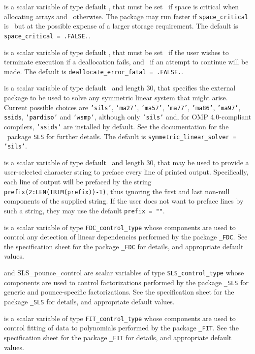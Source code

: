 \documentclass{galahad}
\begin{document}
\begin{description}
 is a scalar variable of type default \logical,
that must be set \true\ if space is critical when allocating arrays
and  \false\ otherwise. The package may run faster if
{\tt space\_critical} is \false\ but at the possible expense of a larger
storage requirement. The default is {\tt space\_critical = .FALSE.}.

 is a scalar variable of type default \logical,
that must be set \true\ if the user wishes to terminate execution if
a deallocation  fails, and \false\ if an attempt to continue
will be made. The default is {\tt deallocate\_error\_fatal = .FALSE.}.

 is a scalar variable of type default \character\
and length 30, that specifies the external package to be used to
solve any symmetric linear system that might arise. Current possible
choices are {\tt 'sils'}, {\tt 'ma27'}, {\tt 'ma57'}, {\tt 'ma77'},
{\tt 'ma86'}, {\tt 'ma97'}, {\tt ssids}, {\tt 'pardiso'}
and {\tt 'wsmp'},
although only {\tt 'sils'} and, for OMP 4.0-compliant compilers,
{\tt 'ssids'} are installed by default.
See the documentation for the \galahad\ package {\tt SLS} for further details.
The default is {\tt symmetric\_linear\_solver = 'sils'}.

 is a scalar variable of type default \character\
and length 30, that may be used to provide a user-selected
character string to preface every line of printed output.
Specifically, each line of output will be prefaced by the string
{\tt prefix(2:LEN(TRIM(prefix))-1)},
thus ignoring the first and last non-null components of the
supplied string. If the user does not want to preface lines by such
a string, they may use the default {\tt prefix = ""}.

 is a scalar variable of type
{\tt FDC\_control\_type}
whose components are used to control any detection of linear dependencies
performed by the package
{\tt \libraryname\_FDC}.
See the specification sheet for the package
{\tt \libraryname\_FDC}
for details, and appropriate default values.

 and {SLS\_pounce\_control}
are scalar variables of type
{\tt SLS\_control\_type}
whose components are used to control factorizations
performed by the package
{\tt \libraryname\_SLS} for generic and pounce-specific factorizations.
See the specification sheet for the package
{\tt \libraryname\_SLS}
for details, and appropriate default values.

 is a scalar variable of type
{\tt FIT\_control\_type}
whose components are used to control fitting of data to polynomials
performed by the package
{\tt \libraryname\_FIT}.
See the specification sheet for the package
{\tt \libraryname\_FIT}
for details, and appropriate default values.


\end{description}
\end{document}
